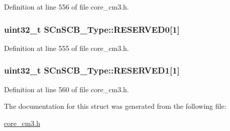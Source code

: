 Definition at line 556 of file core\+\_\+cm3.\+h.

\subsubsection[{\texorpdfstring{R\+E\+S\+E\+R\+V\+E\+D0}{RESERVED0}}]{\setlength{\rightskip}{0pt plus 5cm}uint32\+\_\+t S\+Cn\+S\+C\+B\+\_\+\+Type\+::\+R\+E\+S\+E\+R\+V\+E\+D0\mbox{[}1\mbox{]}}\hypertarget{structSCnSCB__Type_afe1d5fd2966d5062716613b05c8d0ae1}{}\label{structSCnSCB__Type_afe1d5fd2966d5062716613b05c8d0ae1}


Definition at line 555 of file core\+\_\+cm3.\+h.

\subsubsection[{\texorpdfstring{R\+E\+S\+E\+R\+V\+E\+D1}{RESERVED1}}]{\setlength{\rightskip}{0pt plus 5cm}uint32\+\_\+t S\+Cn\+S\+C\+B\+\_\+\+Type\+::\+R\+E\+S\+E\+R\+V\+E\+D1\mbox{[}1\mbox{]}}\hypertarget{structSCnSCB__Type_a7343aadfc9e7a15e58c26b67c5d576c1}{}\label{structSCnSCB__Type_a7343aadfc9e7a15e58c26b67c5d576c1}


Definition at line 560 of file core\+\_\+cm3.\+h.



The documentation for this struct was generated from the following file\+:\begin{DoxyCompactItemize}
\item 
\hyperlink{core__cm3_8h}{core\+\_\+cm3.\+h}\end{DoxyCompactItemize}
